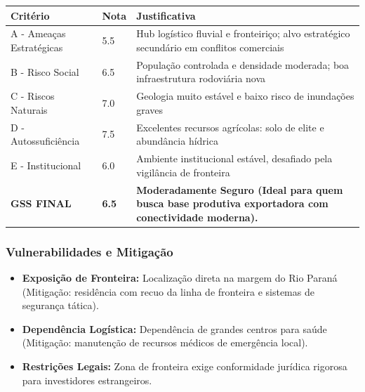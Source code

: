 \begin{table}[ht!]
\small \begin{tabular}{p{3.0cm}p{0.8cm}p{6.0cm}} \toprule
\textbf{Critério} & \textbf{Nota} & \textbf{Justificativa} \\ \midrule
A - Ameaças Estratégicas & 5.5 & Hub logístico fluvial e fronteiriço; alvo estratégico secundário em conflitos comerciais \\
B - Risco Social & 6.5 & População controlada e densidade moderada; boa infraestrutura rodoviária nova \\
C - Riscos Naturais & 7.0 & Geologia muito estável e baixo risco de inundações graves \\
D - Autossuficiência & 7.5 & Excelentes recursos agrícolas: solo de elite e abundância hídrica \\
E - Institucional & 6.0 & Ambiente institucional estável, desafiado pela vigilância de fronteira \\
\midrule \textbf{GSS FINAL} & \textbf{6.5} & \textbf{Moderadamente Seguro (Ideal para quem busca base produtiva exportadora com conectividade moderna).} \\ \bottomrule \end{tabular}
\end{table}
\subsubsection{Vulnerabilidades e
Mitigação}

\begin{itemize}
\tightlist
\item
  \textbf{Exposição de Fronteira:} Localização direta na margem do Rio
  Paraná (Mitigação: residência com recuo da linha de fronteira e
  sistemas de segurança tática).
\item
  \textbf{Dependência Logística:} Dependência de grandes centros para
  saúde (Mitigação: manutenção de recursos médicos de emergência local).
\item
  \textbf{Restrições Legais:} Zona de fronteira exige conformidade
  jurídica rigorosa para investidores estrangeiros.
\end{itemize}

